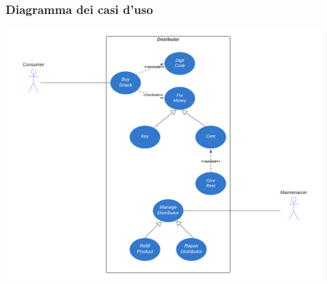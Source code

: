 \documentclass{article}
\begin{document}
\subsubsection*{Diagramma dei casi d'uso}
\large
\begin{center}
    \includegraphics[width=0.9\textwidth]{foto 1.png}
\end{center}
\end{document}
